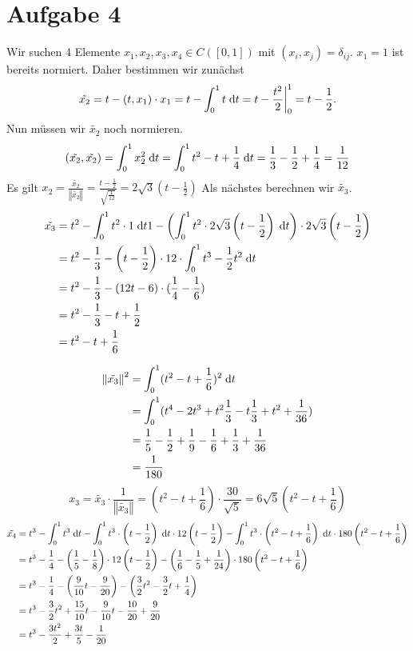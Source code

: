 \documentclass{article}
\theoremstyle{definition}
\newcommand{\norm}[1]{\left\Vert #1 \right\Vert}
\begin{document}
\section*{Aufgabe 4}
Wir suchen 4 Elemente $x_1, x_2, x_3, x_4 \in C([0,1])$ mit $(x_i, x_j) = \delta_{ij}$. $x_1 = 1$ ist bereits normiert. Daher bestimmen wir zunächst
$$\tilde{x_2} = t - (t, x_1) \cdot x_1 = t - \int_0^1 t \d t = t - \frac{t^2}{2}\bigg|_0^1 = t - \frac{1}{2}.$$
Nun müssen wir $\tilde{x_2}$ noch normieren.
$$(\tilde{x_2}, \tilde{x_2}) = \int_0^1 x_2^2 \d t= \int_0^1 t^2 -t + \frac{1}{4}\d t = \frac{1}{3} - \frac{1}{2} + \frac{1}{4} = \frac{1}{12}$$
Es gilt $x_2 = \frac{\tilde{x_2}}{\norm{\tilde{x_2}}} = \frac{t-\frac{1}{2}}{\sqrt{\frac{1}{12}}} = 2 \sqrt{3} \left(t - \frac{1}{2}\right)$
Als nächstes berechnen wir $\tilde{x_3}$.
\begin{align*}
	\tilde{x_3} &= t^2 - \int_0^1 t^2\cdot 1 \d t 1 - \left(\int_0^1t^2 \cdot 2 \sqrt{3} \left(t - \frac{1}{2}\right) \d t\right)\cdot 2 \sqrt{3} \left(t - \frac{1}{2}\right)\\
	&= t^2 - \frac{1}{3} - \left(t - \frac{1}{2}\right) \cdot 12 \cdot \int_0^1t^3 - \frac{1}{2}t^2 \d t\\
	&= t^2 - \frac{1}{3} - \left(12t - 6\right)  \cdot (\frac{1}{4} - \frac{1}{6})\\
	&= t^2 - \frac{1}{3} - t + \frac{1}{2}\\
	&= t^2 - t + \frac{1}{6}
\end{align*}

\begin{align*}
	\norm{\tilde{x_3}}^2 &= \int_0^1 (t^2 - t + \frac{1}{6})^2 \d t\\
	&= \int_0^1 (t^4 - 2t^3 + t^2\frac{1}{3} - t\frac{1}{3} + t^2 + \frac{1}{36})\\
	&= \frac{1}{5} - \frac{1}{2} + \frac{1}{9} - \frac{1}{6} + \frac{1}{3} + \frac{1}{36}\\
	&= \frac{1}{180}
\end{align*}
$$x_3 = \tilde{x_3} \cdot \frac{1}{\norm{\tilde{x_3}}} = (t^2 - t + \frac{1}{6}) \cdot \frac{30}{\sqrt{5}} = 6 \sqrt{5} \left(t^{2} - t + \frac{1}{6}\right)$$
\begin{align*}
	\tilde{x_4} &= t^3 - \int_0^1 t^3 \d t - \int_0^1 t^3\cdot \left(t - \frac{1}{2}\right)\d t \cdot 12 \left(t - \frac{1}{2}\right) - \int_0^1 t^3\cdot \left(t^{2} - t + \frac{1}{6}\right) \d t \cdot 180 \left(t^{2} - t + \frac{1}{6}\right)\\
	&= t^3 - \frac{1}{4} - \left(\frac{1}{5} - \frac{1}{8}\right)\cdot 12 \left(t - \frac{1}{2}\right) - \left(\frac{1}{6} - \frac{1}{5} + \frac{1}{24}\right)\cdot 180 \left(t^{2} - t + \frac{1}{6}\right)\\
	&= t^3 - \frac{1}{4} - \left(\frac{9}{10}t - \frac{9}{20}\right) - \left(\frac{3}{2}t^{2} - \frac{3}{2}t + \frac{1}{4}\right)\\
	&= t^3 - \frac{3}{2}t^2 + \frac{15}{10}t - \frac{9}{10}t - \frac{10}{20} + \frac{9}{20}\\
	&= t^{3} - \frac{3 t^{2}}{2} + \frac{3 t}{5} - \frac{1}{20}
\end{align*}
\end{document}
